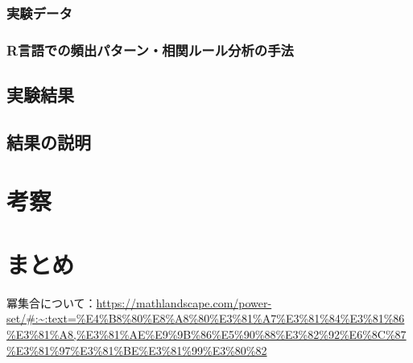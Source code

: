 \documentclass[dvipdfmx]{jsarticle}
\begin{document}
\subsubsection{実験データ}
\subsubsection{R言語での頻出パターン・相関ルール分析の手法}
\subsection{実験結果}
\subsection{結果の説明}

\section{考察}
\section{まとめ}

\begin{thebibliography}{99}
  \bibitem 冪集合について：\url{https://mathlandscape.com/power-set/#:~:text=%E4%B8%80%E8%A8%80%E3%81%A7%E3%81%84%E3%81%86%E3%81%A8,%E3%81%AE%E9%9B%86%E5%90%88%E3%82%92%E6%8C%87%E3%81%97%E3%81%BE%E3%81%99%E3%80%82}
\end{thebibliography}
\end{document}
